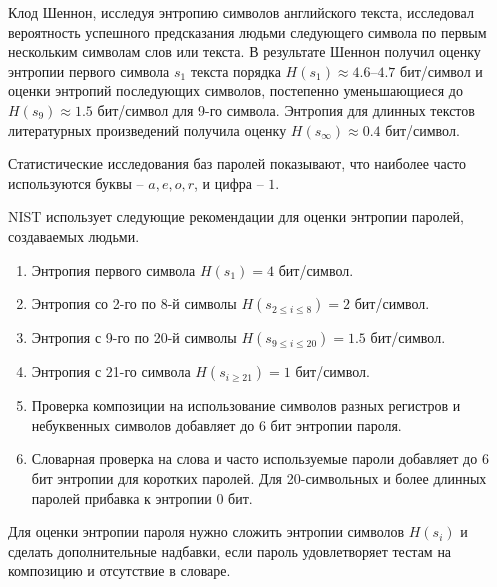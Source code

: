\documentclass[10pt,a4paper]{book}
\begin{document}
Клод Шеннон, исследуя энтропию символов английского текста, исследовал вероятность успешного предсказания людьми следующего символа по первым нескольким символам слов или текста. В результате Шеннон получил оценку энтропии первого символа $s_1$ текста порядка $H(s_1) \approx 4.6$--$4.7$ бит/символ и оценки энтропий последующих символов, постепенно уменьшающиеся до $H(s_9) \approx 1.5$ бит/символ для 9-го символа. Энтропия для длинных текстов литературных произведений получила оценку $H(s_\infty) \approx 0.4$ бит/символ.

Статистические исследования баз паролей показывают, что наиболее часто используются буквы -- $a,e,o,r$, и цифра -- $1$.

NIST использует следующие рекомендации для оценки энтропии паролей, создаваемых людьми.
\begin{enumerate}
    \item Энтропия первого символа $H(s_1) = 4$ бит/символ.
    \item Энтропия со 2-го по 8-й символы $H(s_{2 \leq i \leq 8}) = 2$ бит/символ.
    \item Энтропия с 9-го по 20-й символы $H(s_{9 \leq i \leq 20}) = 1.5$ бит/символ.
    \item Энтропия с 21-го символа $H(s_{i \geq 21}) = 1$ бит/символ.
    \item Проверка композиции на использование символов разных регистров и небуквенных символов добавляет до 6 бит энтропии пароля.
    \item Словарная проверка на слова и часто используемые пароли добавляет до 6 бит энтропии для коротких паролей. Для 20-символьных и более длинных паролей прибавка к энтропии   0 бит.
\end{enumerate}

Для оценки энтропии пароля нужно сложить энтропии символов $H(s_i)$ и сделать дополнительные надбавки, если пароль удовлетворяет тестам на композицию и отсутствие в словаре.
\end{document}

